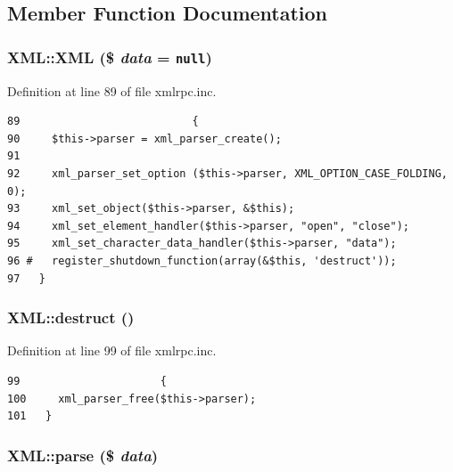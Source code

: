 \subsection{Member Function Documentation}
\hypertarget{classXML_1475a1374023931e2227277f4047c9aa}{
\subsubsection{\setlength{\rightskip}{0pt plus 5cm}XML::XML (\$ {\em data} = {\tt null})}}
\label{classXML_1475a1374023931e2227277f4047c9aa}




Definition at line 89 of file xmlrpc.inc.

\begin{Code}\begin{verbatim}89                           {
90     $this->parser = xml_parser_create();
91 
92     xml_parser_set_option ($this->parser, XML_OPTION_CASE_FOLDING, 0);
93     xml_set_object($this->parser, &$this);
94     xml_set_element_handler($this->parser, "open", "close");
95     xml_set_character_data_handler($this->parser, "data");
96 #   register_shutdown_function(array(&$this, 'destruct'));
97   }
\end{verbatim}
\end{Code}


\hypertarget{classXML_d1524d80c783b2cd22966462411b9b7d}{
\subsubsection{\setlength{\rightskip}{0pt plus 5cm}XML::destruct ()}}
\label{classXML_d1524d80c783b2cd22966462411b9b7d}




Definition at line 99 of file xmlrpc.inc.

\begin{Code}\begin{verbatim}99                      {
100     xml_parser_free($this->parser);
101   }
\end{verbatim}
\end{Code}


\hypertarget{classXML_61e6258dc3d5750100e1f0dd08d6334a}{
\subsubsection{\setlength{\rightskip}{0pt plus 5cm}XML::parse (\$ {\em data})}}
\label{classXML_61e6258dc3d5750100e1f0dd08d6334a}




